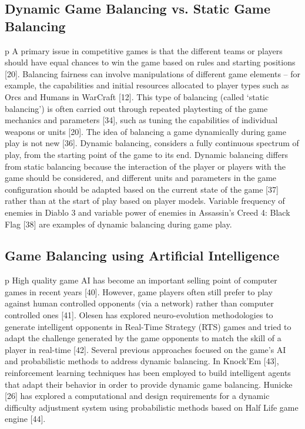 \subsection{Dynamic Game Balancing vs. Static Game Balancing }
p A primary issue in competitive games is that the different teams or players should have equal chances to win the game based on rules and starting positions [20]. Balancing fairness can involve manipulations of different game elements – for example, the capabilities and initial resources allocated to player types such as Orcs and Humans in WarCraft [12]. This type of balancing (called ‘static balancing’) is often carried out through repeated playtesting of the game mechanics and parameters [34], such as tuning the capabilities of individual weapons or units [20].  The idea of balancing a game dynamically during game play is not new [36]. Dynamic balancing, considers a fully continuous spectrum of play, from the starting point of the game to its end. Dynamic balancing differs from static balancing because the interaction of the player or players with the game should be considered, and different units and parameters in the game configuration should be adapted based on the current state of the game [37] rather than at the start of play based on player models. Variable frequency of enemies in Diablo 3 and variable power of enemies in Assassin’s Creed 4: Black Flag [38] are examples of dynamic balancing during game play. 


\subsection{Game Balancing using Artificial Intelligence}
p High quality game AI has become an important selling point of computer games in recent years [40]. However, game players often still prefer to play against human controlled opponents (via a network) rather than computer controlled ones [41]. Olesen has explored neuro-evolution methodologies to generate intelligent opponents in Real-Time Strategy (RTS) games and tried to adapt the challenge generated by the game opponents to match the skill of a player in real-time [42]. Several previous approaches focused on the game’s AI and probabilistic methods to address dynamic balancing. In Knock’Em [43], reinforcement learning techniques has been employed to build intelligent agents that adapt their behavior in order to provide dynamic game balancing. Hunicke [26] has explored a computational and design requirements for a dynamic difficulty adjustment system using probabilistic methods based on Half Life game engine [44]. 

